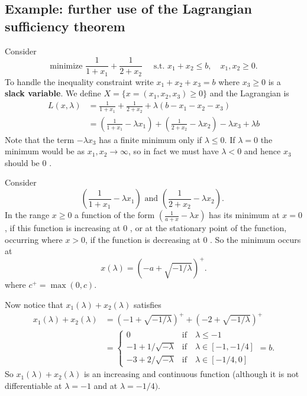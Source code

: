 \subsection{Example: further use of the Lagrangian sufficiency theorem}
\begin{example}
    Consider 
    \[
        \text{minimize } \frac{1}{1+x_1}+\frac{1}{2+x_2} \quad \text { s.t. } x_1+x_2 \le b, \quad x_1, x_2 \ge 0.
    \]
    To handle the inequality constraint write $x_1+x_2+x_3=b$ where $x_3 \ge 0$ is a \textbf{slack variable}. We define $X=\{x=(x_1,x_2,x_3 ) \ge 0\}$ and the Lagrangian is
    \[
    \begin{aligned}
    L(x, \lambda) &=\frac{1}{1+x_1}+\frac{1}{2+x_2}+\lambda\left(b-x_1-x_2-x_3\right) \\
    &=\left(\frac{1}{1+x_1}-\lambda x_1\right)+\left(\frac{1}{2+x_2}-\lambda x_2\right)-\lambda x_3+\lambda b
    \end{aligned}
    \]
    Note that the term $-\lambda x_3$ has a finite minimum only if $\lambda \le 0$. If $\lambda=0$ the minimum would be as $x_1, x_2 \rightarrow \infty$, so in fact we must have $\lambda<0$ and hence $x_3$ should be 0 .

    Consider
    \[
    \left(\frac{1}{1+x_1}-\lambda x_1\right) \text { and }\left(\frac{1}{2+x_2}-\lambda x_2\right) \text {. }
    \]
    In the range $x \geq 0$ a function of the form $\left(\frac{1}{a+x}-\lambda x\right)$ has its minimum at $x=0$, if this function is increasing at 0 , or at the stationary point of the function, occurring where $x>0$, if the function is decreasing at 0 . So the minimum occurs at
    \[
    x(\lambda)=\left(-a+\sqrt{-1 / \lambda}\right)^{+} .
    \]
    where $c^{+}=\max (0, c)$.

    Now notice that $x_1(\lambda)+x_2(\lambda)$ satisfies
    \begin{align*}
        x_1(\lambda) + x_2(\lambda)&= \left( -1+\sqrt{-1/\lambda} \right)^+ + \left( -2+\sqrt{-1/\lambda} \right)^+\\ 
        &=  \begin{cases}
            0 & \text{if}\quad \lambda \le -1 \\
            -1+1 / \sqrt{-\lambda} & \text{if}\quad \lambda \in[-1,-1 / 4] \\
            -3+2 / \sqrt{-\lambda} &\text{if}\quad \lambda \in[-1 / 4,0]
        \end{cases} = b. 
    \end{align*}
    So $x_1(\lambda)+x_2(\lambda)$ is an increasing and continuous function (although it is not differentiable at $\lambda=-1$ and at $\lambda=-1 / 4)$.


\end{example}
